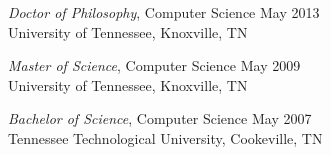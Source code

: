 {\sl Doctor of Philosophy}, Computer Science \hfill May 2013 \\
University of Tennessee, Knoxville, TN 

{\sl Master of Science}, Computer Science \hfill May 2009 \\
University of Tennessee, Knoxville, TN 

{\sl Bachelor of Science}, Computer Science \hfill May 2007 \\
Tennessee Technological University, Cookeville, TN
